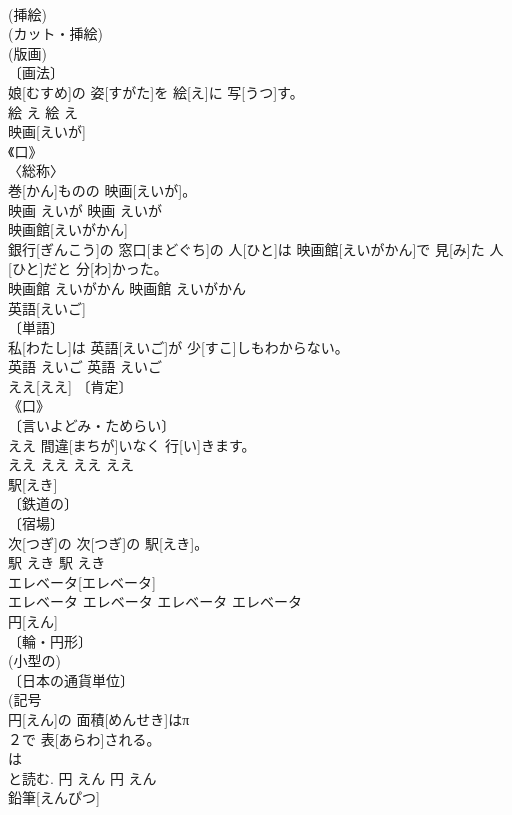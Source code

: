 \documentclass[8pt]{extreport}
\begin{document}
\begin{CJK}{UTF8}{min}
\\	(挿絵) 
\\	(カット・挿絵) 
\\	(版画) 
\\	〔画法〕 
\\	娘[むすめ]の 姿[すがた]を 絵[え]に 写[うつ]す。	
\\	絵	え	絵	え	
\\	映画[えいが]	
\\	《口》 
\\	〈総称〉 
\\	巻[かん]ものの 映画[えいが]。	
\\	映画	えいが	映画	えいが	
\\	映画館[えいがかん]	
\\	銀行[ぎんこう]の 窓口[まどぐち]の 人[ひと]は 映画館[えいがかん]で 見[み]た 人[ひと]だと 分[わ]かった。	
\\	映画館	えいがかん	映画館	えいがかん	
\\	英語[えいご]	
\\	〔単語〕 
\\	私[わたし]は 英語[えいご]が 少[すこ]しもわからない。	
\\	英語	えいご	英語	えいご	
\\	ええ[ええ]	〔肯定〕 
\\	《口》 
\\	〔言いよどみ・ためらい〕 
\\	[⇒ええっ, ええと]	ええ 間違[まちが]いなく 行[い]きます。	
\\	ええ	ええ	ええ	ええ	
\\	駅[えき]	
\\	〔鉄道の〕 
\\	〔宿場〕 
\\	次[つぎ]の 次[つぎ]の 駅[えき]。	
\\	駅	えき	駅	えき	
\\	エレベータ[エレベータ]	
\\	エレベータ	エレベータ	エレベータ	エレベータ	
\\	円[えん]	
\\	〔輪・円形〕 
\\	(小型の) 
\\	〔日本の通貨単位〕 
\\	(記号 
\\	円[えん]の 面積[めんせき]はπ
\\	２で 表[あらわ]される。	
\\	は 
\\	と読む.	円	えん	円	えん	
\\	鉛筆[えんぴつ]	

\end{CJK}
\end{document}
